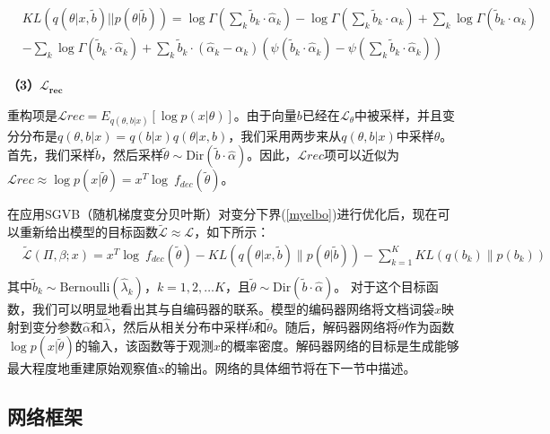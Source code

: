 \begin{align}
	\label{kl1}
	&KL(q(\theta\vert x,\tilde{b})||p(\theta\vert \tilde{b}))=\log\Gamma(\sum_k\tilde{b}_k\cdot\hat{\alpha}_k)-\log\Gamma(\sum_k\tilde{b}_k\cdot\alpha_k)\nonumber+\sum_k\log\Gamma(\tilde{b}_k\cdot\alpha_k)\\
	&-\sum_k\log\Gamma(\tilde{b}_k\cdot\hat{\alpha}_k)+\sum_k\tilde{b}_k\cdot(\hat{\alpha}_k-\alpha_k)(\psi(\tilde{b}_k\cdot\hat{\alpha}_k)-\psi(\sum_k\tilde{b}_k\cdot\hat{\alpha}_k))
\end{align}

\textbf{（3）$\boldsymbol{\mathcal{L}_{rec}}$}

重构项是$\mathcal{L}{rec}=E_{q(\theta,b\vert x)}\left[\log p(x\vert\theta)\right]$。由于向量$b$已经在$\mathcal{L}_\theta$中被采样，并且变分分布是$q(\theta,b\vert x)=q(b\vert x)q(\theta\vert x,b)$，我们采用两步来从$q(\theta,b\vert x)$中采样$\theta$。首先，我们采样$\tilde{b}$，然后采样$\tilde{\theta}\sim\mbox{Dir}(\tilde{b}\cdot\hat{\alpha})$。因此，$\mathcal{L}{rec}$项可以近似为$\mathcal{L}{rec}\approx \log p(x\vert\tilde{\theta})=x^{T}\log\ f_{dec}(\tilde{\theta})$。

在应用SGVB（随机梯度变分贝叶斯）对变分下界(\ref{myelbo})进行优化后，现在可以重新给出模型的目标函数$\tilde{\mathcal{L}}\approx\mathcal{L}$，如下所示：
\begin{equation} 
	\begin{aligned}
		&\tilde{\mathcal{L}}(\Pi,\beta;x)=x^{T}\log\ f_{dec}(\tilde{\theta})-KL(q(\theta\vert x,\tilde{b})\|p(\theta\vert \tilde{b}))-\sum^K_{k=1}KL(q(b_k)\|p(b_k))\\
	\end{aligned}
	\label{elbo_approx}
\end{equation}
其中$\tilde{b}_k\sim\mbox{Bernoulli}(\hat{\lambda}_k)$，$k=1,2,\dots K$，且$\tilde{\theta}\sim\mbox{Dir}(\tilde{b}\cdot\hat{\alpha})$。 对于这个目标函数，我们可以明显地看出其与自编码器的联系。模型的编码器网络将文档词袋$x$映射到变分参数$\hat{\alpha}$和$\hat{\lambda}$，然后从相关分布中采样$\tilde{b}$和$\tilde{\theta}$。随后，解码器网络将$\tilde{\theta}$作为函数$\log p(x\vert\tilde{\theta})$的输入，该函数等于观测$x$的概率密度。解码器网络的目标是生成能够最大程度地重建原始观察值x的输出。网络的具体细节将在下一节中描述。

\subsection{网络框架}

